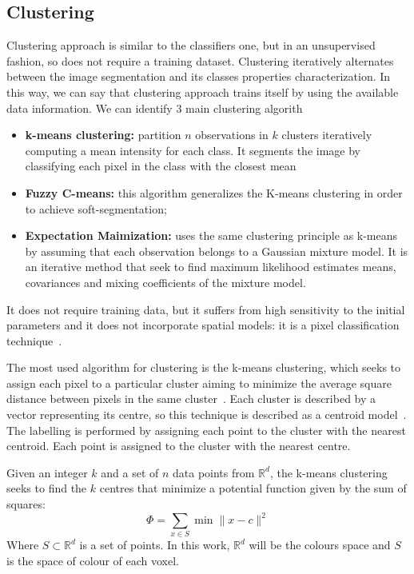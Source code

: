 \documentclass{standalone}
\begin{document}
\subsection{Clustering}

	Clustering approach is similar to the classifiers one, but in an unsupervised fashion, so does not require a training dataset.
	Clustering iteratively alternates between the image segmentation and its classes properties characterization. In this way, we can say that clustering approach trains itself by using the available data information.
	We can identify 3 main clustering algorith
	\begin{itemize}
	
		\item \textbf{k-means clustering: } partition $n$ observations in $k$ clusters iteratively computing a mean intensity for each class. It segments the image by classifying each pixel in the class with the closest mean
	
		\item \textbf{Fuzzy C-means: } this algorithm generalizes the K-means clustering in order to achieve soft-segmentation;
		
		\item \textbf{Expectation Maimization:} uses the same clustering principle as k-means by assuming that each observation belongs to a Gaussian mixture model. It is an iterative method that seek to find maximum likelihood estimates means, covariances and mixing coefficients of the mixture model.
	\end{itemize}

	It does not require training data, but it suffers from high sensitivity to the initial parameters and it does not incorporate spatial models: it is a pixel classification technique~\cite{ART:Pham}. 
	
	The most used algorithm for clustering is the k-means clustering, which seeks to assign each pixel to a particular cluster aiming to minimize the average square distance between pixels in the same cluster~\cite{Arthur2007}. Each cluster is described by a vector representing its centre, so this technique is described as a centroid model~\cite{ART:Morisette}. The labelling is performed by assigning each point to the cluster with the nearest centroid. Each point is assigned to the cluster with the nearest centre.
	
	Given an integer $k$ and a set of $n$ data points from $\mathbb{R}^d$, the k-means clustering seeks to find the $k$ centres that minimize a potential function given by the sum of squares: 
	\begin{equation}
		\Phi = \sum_{x\in S}\min\| x - c\|^2
	\end{equation} 
	Where $S\subset \mathbb R^d$ is a set of points. In this work, $\mathbb{R}^d$ will be the colours space and $S$ is the space of colour of each voxel.
	
\end{document}
